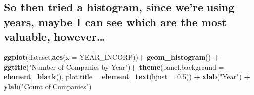 \documentclass[]{article}
\newenvironment{Shaded}{\begin{snugshade}}{\end{snugshade}}
\newcommand{\CommentTok}[1]{\textcolor[rgb]{0.56,0.35,0.01}{\textit{#1}}}
\newcommand{\DataTypeTok}[1]{\textcolor[rgb]{0.13,0.29,0.53}{#1}}
\newcommand{\DecValTok}[1]{\textcolor[rgb]{0.00,0.00,0.81}{#1}}
\newcommand{\FloatTok}[1]{\textcolor[rgb]{0.00,0.00,0.81}{#1}}
\newcommand{\KeywordTok}[1]{\textcolor[rgb]{0.13,0.29,0.53}{\textbf{#1}}}
\newcommand{\NormalTok}[1]{#1}
\newcommand{\OperatorTok}[1]{\textcolor[rgb]{0.81,0.36,0.00}{\textbf{#1}}}
\newcommand{\StringTok}[1]{\textcolor[rgb]{0.31,0.60,0.02}{#1}}
\begin{document}
\begin{Shaded}
\end{Shaded}

\hypertarget{so-then-tried-a-histogram-since-were-using-years-maybe-i-can-see-which-are-the-most-valuable-however}{%
\subsection{So then tried a histogram, since we're using years, maybe I
can see which are the most valuable,
however\ldots{}}\label{so-then-tried-a-histogram-since-were-using-years-maybe-i-can-see-which-are-the-most-valuable-however}}

\begin{Shaded}
\begin{Highlighting}[]
\KeywordTok{ggplot}\NormalTok{(dataset,}\KeywordTok{aes}\NormalTok{(}\DataTypeTok{x =}\NormalTok{ YEAR_INCORP))}\OperatorTok{+}
\StringTok{  }\KeywordTok{geom_histogram}\NormalTok{() }\OperatorTok{+}
\StringTok{  }\KeywordTok{ggtitle}\NormalTok{(}\StringTok{"Number of Companies by Year"}\NormalTok{)}\OperatorTok{+}
\StringTok{  }\KeywordTok{theme}\NormalTok{(}\DataTypeTok{panel.background =} \KeywordTok{element_blank}\NormalTok{(),}
        \DataTypeTok{plot.title =} \KeywordTok{element_text}\NormalTok{(}\DataTypeTok{hjust =} \FloatTok{0.5}\NormalTok{)) }\OperatorTok{+}
\StringTok{  }\KeywordTok{xlab}\NormalTok{(}\StringTok{"Year"}\NormalTok{) }\OperatorTok{+}
\StringTok{  }\KeywordTok{ylab}\NormalTok{(}\StringTok{"Count of Companies"}\NormalTok{)}
\end{Highlighting}
\end{Shaded}
\end{document}
